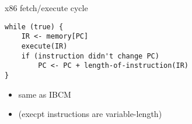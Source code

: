 \begin{frame}[fragile,label=x86FetchExec]{x86 fetch/execute cycle}
\begin{Verbatim}
while (true) {
    IR <- memory[PC]
    execute(IR)
    if (instruction didn't change PC)
        PC <- PC + length-of-instruction(IR)
}
\end{Verbatim}
\begin{itemize}
\item same as IBCM 
\item (execpt instructions are variable-length)
\end{itemize}
\end{frame}
